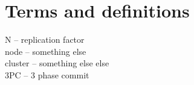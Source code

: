 
\section{Terms and definitions}\label{sec:introduction:terms}

N -- replication factor \\
node -- something else \\
cluster -- something else else \\
3PC -- 3 phase commit 